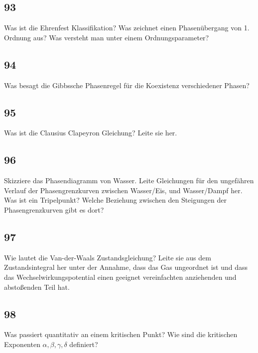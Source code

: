 \documentclass[12pt,a4paper]{report}
\newenvironment{myfrag}{\begin{it}}{\end{it}\vspace{3mm}\par}
\numberwithin{equation}{section}
\begin{document}
\subsection{93}
\begin{myfrag}
Was ist die Ehrenfest Klassifikation? Was zeichnet einen Phasenübergang von 1.
Ordnung aus? Was versteht man unter einem Ordnungsparameter?
\end{myfrag}
\subsection{94}
\begin{myfrag}
Was besagt die Gibbssche Phasenregel für die Koexistenz verschiedener Phasen?
\end{myfrag}
\subsection{95}
\begin{myfrag}
Was ist die Clausius Clapeyron Gleichung? Leite sie her.
\end{myfrag} 
\subsection{96}
\begin{myfrag}
Skizziere das Phasendiagramm von Wasser. Leite Gleichungen für den
ungefähren Verlauf der Phasengrenzkurven zwischen Wasser/Eis, und
Wasser/Dampf her. Was ist ein Tripelpunkt? Welche Beziehung zwischen
den Steigungen der Phasengrenzkurven gibt es dort?
\end{myfrag} 
\subsection{97}
\begin{myfrag}
Wie lautet die Van-der-Waals Zustandsgleichung? Leite sie aus dem
Zustandsintegral her unter der Annahme, dass das Gas ungeordnet ist und
dass das Wechselwirkungspotential einen geeignet vereinfachten anziehenden
und abstoßenden Teil hat.
\end{myfrag} 
\subsection{98}
\begin{myfrag}
Was passiert quantitativ an einem kritischen Punkt? Wie sind die kritischen
Exponenten $\alpha, \beta , \gamma , \delta $ definiert? 
\end{myfrag} 
\end{document}
